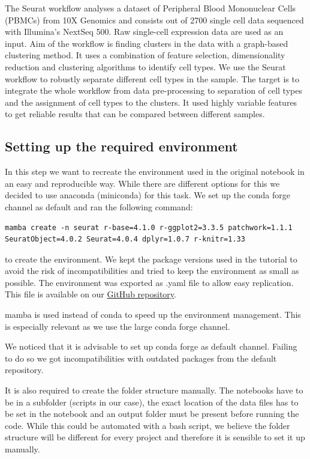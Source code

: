 \documentclass[a4paper, 10pt]{scrartcl}
\begin{document}
The Seurat workflow analyses a dataset of Peripheral Blood Mononuclear
Cells (PBMCs) from 10X Genomics and consists out of 2700 single cell
data sequenced with Illumina's NextSeq 500. Raw single-cell expression
data are used as an input. Aim of the workflow is finding clusters in
the data with a graph-based clustering method. It uses a combination of
feature selection, dimensionality reduction and clustering algorithms to
identify cell types. We use the Seurat workflow to robustly separate
different cell types in the sample. The target is to integrate the whole
workflow from data pre-processing to separation of cell types and the
assignment of cell types to the clusters. It used highly variable
features to get reliable results that can be compared between different
samples.

\hypertarget{setting-up-the-required-environment}{%
\subsection{Setting up the required
environment}\label{setting-up-the-required-environment}}

In this step we want to recreate the environment used in the original
notebook in an easy and reproducible way. While there are different
options for this we decided to use anaconda (miniconda) for this task.
We set up the conda forge channel as default and ran the following
command:

\begin{verbatim}
mamba create -n seurat r-base=4.1.0 r-ggplot2=3.3.5 patchwork=1.1.1
SeuratObject=4.0.2 Seurat=4.0.4 dplyr=1.0.7 r-knitr=1.33
\end{verbatim}


to create the environment. We kept the package versions used in the
tutorial to avoid the risk of incompatibilities and tried to keep the
environment as small as possible. The environment was exported as .yaml
file to allow easy replication. This file is available on our
\href{https://github.com/gschloegel/Course_Fallstudie_scRNA-Seq-with-Seurat}{GitHub
repository}.

mamba is used instead of conda to speed up the environment management.
This is especially relevant as we use the large conda forge channel.

We noticed that it is advisable to set up conda forge as default
channel. Failing to do so we got incompatibilities with outdated
packages from the default repository.

It is also required to create the folder structure manually. The
notebooks have to be in a subfolder (scripts in our case), the exact
location of the data files has to be set in the notebook and an output
folder must be present before running the code. While this could be
automated with a bash script, we believe the folder structure will be
different for every project and therefore it is sensible to set it up
manually.
\end{document}

